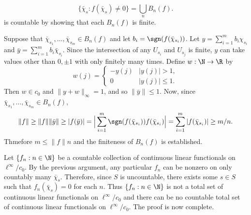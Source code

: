 \begin{example}
\[\{\bar{\chi}_s:f(\bar{\chi}_s)\neq 0\}=\bigcup_{n}B_n(f).\]
is countable by showing that each $B_n(f)$ is finite.\par
Suppose that $\bar{\chi}_{s_1},\dots,\bar{\chi}_{s_m}\in B_n(f)$ and let $b_i=\sgn(f(\bar{\chi}_{s_i}))$. Let $y=\sum_{i=1}^{m}b_i\chi_{s_i}$ and $\bar{y}=\sum_{i=1}^{m}b_i\bar{\chi}_{s_i}$. Since the intersection of any $U_{s_i}$ and $U_{s_j}$ is finite, $y$ can take values other than $0,\pm 1$ with only finitely many times. Define $w:\N\to\R$ by
\[w(j)=\begin{cases}
-y(j)&|y(j)|>1,\\
0&|y(j)|\leq 1.
\end{cases}\]
Then $w\in c_0$ and $\|y+w\|_\infty=1$, and so $\|\bar{y}\|\leq 1$. Now, since $\bar{\chi}_{s_1},\dots,\bar{\chi}_{s_m}\in B_n(f)$,
\[\|f\|\geq\|f\|\|\bar{y}\|\geq|f(\bar{y})|=\Big|\sum_{i=1}^{m}\sgn(f(\bar{\chi}_{s_i}))f(\bar{\chi}_{s_i})\Big|=\sum_{i=1}^{m}|f(\bar{\chi}_{s_i})|\geq m/n.\]
Thmefore $m\leq\|f\|n$ and the finiteness of $B_n(f)$ is established.\par
Let $\{f_n:n\in\N\}$ be a countable collection of continuous linear functionals on $\ell^\infty/c_0$. By the previous argument, any particular $f_n$ can be nonzero on only countably many $\bar{\chi}_s$. Therefore, since $S$ is uncountable, there exists some $s\in S$ such that $f_n(\bar{\chi}_s)=0$ for each $n$. Thus $\{f_n:n\in\N\}$ is not a total set of continuous linear functionals on $\ell^\infty/c_0$ and there can be no countable total set of continuous linear functionals on $\ell^\infty/c_0$. The proof is now complete.
\end{example}
